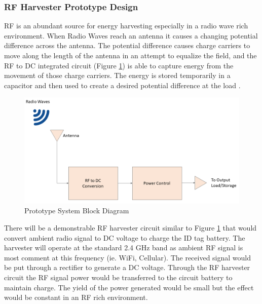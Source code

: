 \break
\subsubsection{RF Harvester Prototype Design}
\medskip
RF is an abundant source for energy harvesting especially in a radio wave rich environment. When Radio Waves reach an antenna it causes a changing potential difference across the antenna. The potential difference causes charge carriers to move along the length of the antenna in an attempt to equalize the field, and the RF to \Gls{DC} integrated circuit (Figure \ref{fig:rfh}) is able to capture energy from the movement of those charge carriers. The energy is stored temporarily in a capacitor and then used to create a desired potential difference at the load \cite{R5}.
\begin{figure}[h!]
    \centering
    \includegraphics[width=\linewidth]{./images/rf_harvest.png}
    \caption{Prototype System Block Diagram}
    \label{fig:rfh}
\end{figure}

\bigskip
There will be a demonstrable RF harvester circuit similar to Figure \ref{fig:rfh} that would convert ambient radio signal to DC voltage to charge the ID tag battery. The harvester will operate at the standard 2.4 GHz band as ambient RF signal is most comment at this frequency (ie. WiFi, Cellular). The received signal would be put through a rectifier to generate a DC voltage. Through the RF harvester circuit the RF signal power would be transferred to the circuit battery to maintain charge. The yield of the power generated would be small but the effect would be constant in an RF rich environment.

\break
